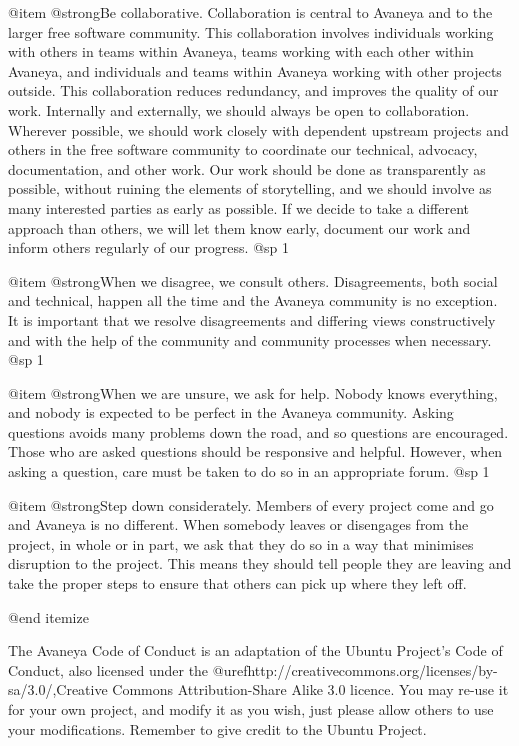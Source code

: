 @item
@strong{Be collaborative.} Collaboration is central to Avaneya and to
the larger free software community. This collaboration involves
individuals working with others in teams within Avaneya, teams working
with each other within Avaneya, and individuals and teams within
Avaneya working with other projects outside. This collaboration
reduces redundancy, and improves the quality of our work. Internally
and externally, we should always be open to collaboration. Wherever
possible, we should work closely with dependent upstream projects and
others in the free software community to coordinate our technical,
advocacy, documentation, and other work. Our work should be done as
transparently as possible, without ruining the elements of
storytelling, and we should involve as many interested parties as
early as possible. If we decide to take a different approach than
others, we will let them know early, document our work and inform
others regularly of our progress.
@sp 1

@item
@strong{When we disagree, we consult others.} Disagreements, both
social and technical, happen all the time and the Avaneya community is
no exception. It is important that we resolve disagreements and
differing views constructively and with the help of the community and
community processes when necessary.
@sp 1

@item
@strong{When we are unsure, we ask for help.} Nobody knows everything,
and nobody is expected to be perfect in the Avaneya community. Asking
questions avoids many problems down the road, and so questions are
encouraged. Those who are asked questions should be responsive and
helpful. However, when asking a question, care must be taken to do so
in an appropriate forum.
@sp 1

@item
@strong{Step down considerately.} Members of every project come and go
and Avaneya is no different. When somebody leaves or disengages from
the project, in whole or in part, we ask that they do so in a way that
minimises disruption to the project. This means they should tell
people they are leaving and take the proper steps to ensure that
others can pick up where they left off.

@end itemize

The Avaneya Code of Conduct is an adaptation of the Ubuntu Project's
Code of Conduct, also licensed under the
@uref{http://creativecommons.org/licenses/by-sa/3.0/,Creative Commons Attribution-Share Alike 3.0} 
licence. You may re-use it for your own project, and modify it as you
wish, just please allow others to use your modifications. Remember to
give credit to the Ubuntu Project.

